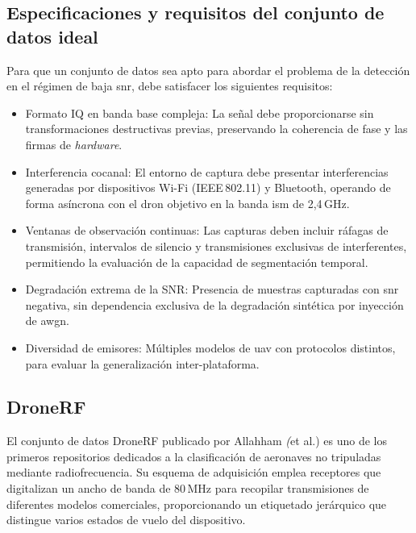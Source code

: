 \subsection{Especificaciones y requisitos del conjunto de datos ideal}
\label{subsec:requisitos_dataset}

Para que un conjunto de datos sea apto para abordar el problema de la detección en el régimen de baja \gls{snr}, debe satisfacer los siguientes requisitos:

\begin{itemize}
  \item Formato IQ en banda base compleja: La señal debe proporcionarse
  sin transformaciones destructivas previas, preservando la coherencia de fase y las firmas de \textit{hardware}.

  \item Interferencia cocanal: El entorno de captura debe
  presentar interferencias generadas por dispositivos Wi-Fi (IEEE\,802.11) y Bluetooth, operando de forma asíncrona con el dron objetivo en la banda \gls{ism} de 2,4\,GHz.

  \item Ventanas de observación continuas: Las capturas deben incluir
  ráfagas de transmisión, intervalos de silencio y transmisiones exclusivas de interferentes, permitiendo la evaluación de la capacidad de segmentación temporal.

  \item Degradación extrema de la SNR: Presencia de muestras capturadas
  con \gls{snr} negativa, sin dependencia exclusiva de la degradación sintética por inyección de \gls{awgn}.

  \item Diversidad de emisores: Múltiples modelos de \gls{uav} con protocolos
  distintos, para evaluar la generalización inter-plataforma.
\end{itemize}

\subsection{DroneRF}
\label{subsec:dronerf}

El conjunto de datos DroneRF publicado por Allahham \textit(et al.) \cite{allahham_dronerf_2019} es uno de los primeros repositorios dedicados a la clasificación de aeronaves no tripuladas mediante radiofrecuencia. Su esquema de adquisición emplea receptores que digitalizan un ancho de banda de 80\,MHz para recopilar transmisiones de diferentes modelos comerciales, proporcionando un etiquetado jerárquico que distingue varios estados de vuelo del dispositivo.

